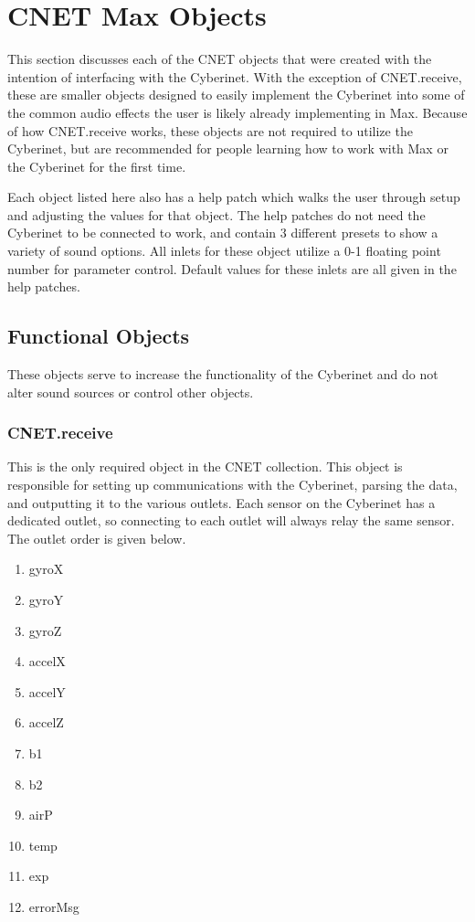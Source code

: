 \section{CNET Max Objects}
This section discusses each of the CNET objects that were created with the intention of interfacing with the Cyberinet. With the exception of CNET.receive, these are smaller objects designed to easily implement the Cyberinet into some of the common audio effects the user is likely already implementing in Max. Because of how CNET.receive works, these objects are not required to utilize the Cyberinet, but are recommended for people learning how to work with Max or the Cyberinet for the first time.

Each object listed here also has a help patch which walks the user through setup and adjusting the values for that object. The help patches do not need the Cyberinet to be connected to work, and contain 3 different presets to show a variety of sound options. All inlets for these object utilize a 0-1 floating point number for parameter control. Default values for these inlets are all given in the help patches.

\subsection{Functional Objects}
These objects serve to increase the functionality of the Cyberinet and do not alter sound sources or control other objects.

\subsubsection{CNET.receive}
This is the only required object in the CNET collection. This object is responsible for setting up communications with the Cyberinet, parsing the data, and outputting it to the various outlets. Each sensor on the Cyberinet has a dedicated outlet, so connecting to each outlet will always relay the same sensor. The outlet order is given below.

\begin{enumerate}
    \item gyroX
    \item gyroY
    \item gyroZ
    \item accelX
    \item accelY
    \item accelZ
    \item b1
    \item b2
    \item airP
    \item temp
    \item exp
    \item errorMsg
\end{enumerate}

